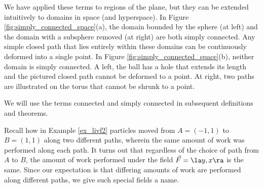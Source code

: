 We have applied these terms to regions of the plane, but they can be extended intuitively to domains in space (and hyperspace). In Figure \ref{fig:simply_connected_space}(a), the domain bounded by the sphere (at left) and the domain with a subsphere removed (at right) are both simply connected. Any simple closed path that lies entirely within these domains can be continuously deformed into a single point. In Figure \ref{fig:simply_connected_space}(b), neither domain is simply connected. A left, the ball has a hole that extends its length and the pictured closed path cannot be deformed to a point. At right, two paths are illustrated on the torus that cannot be shrunk to a point. 

We will use the terms connected and simply connected in subsequent definitions and theorems.


Recall how in Example \ref{ex_livf2} particles moved from $A = (-1,1)$ to $B = (1,1)$ along two different paths, wherein the same amount of work was performed along each path. It turns out that regardless of the choice of path from $A$ to $B$, the amount of work performed under the field $\vec F = \la y, x\ra$ is the same. Since our expectation is that differing amounts of work are performed along different paths, we give such special fields a name. %

